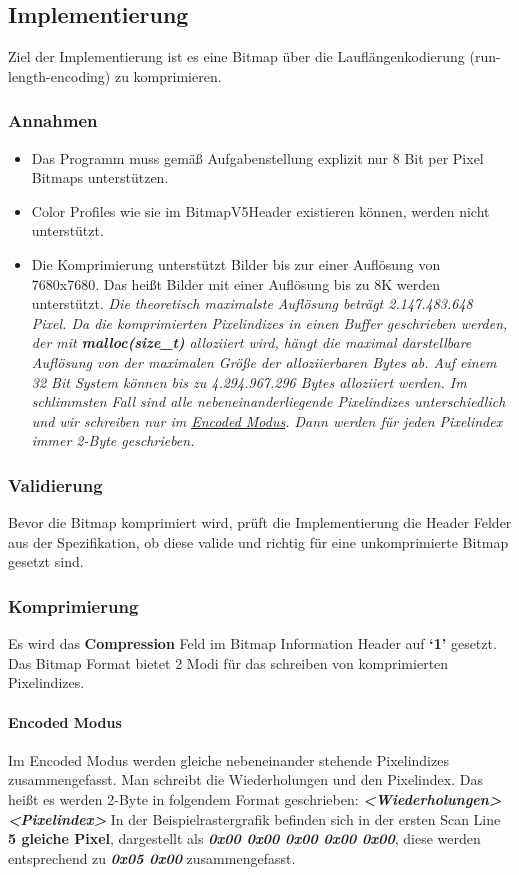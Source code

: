 \documentclass[course=erap]{aspdoc}
\begin{document}
\subsection{Implementierung}
Ziel der Implementierung ist es eine Bitmap über die Lauflängenkodierung (run-length-encoding) zu komprimieren.

\subsubsection{Annahmen}
\begin{itemize}
  \item Das Programm muss gemäß Aufgabenstellung explizit nur 8 Bit per Pixel Bitmaps unterstützen.
  \item Color Profiles wie sie im BitmapV5Header existieren können, werden nicht unterstützt.
  \item Die Komprimierung unterstützt Bilder bis zur einer Auflösung von 7680x7680. Das heißt Bilder mit einer Auflösung bis zu 8K werden unterstützt. \newline\newline
  \textit{Die theoretisch maximalste Auflösung beträgt 2.147.483.648 Pixel.
  Da die komprimierten Pixelindizes in einen Buffer geschrieben werden, der mit \textbf{malloc(size\_t)} alloziiert wird, hängt die maximal darstellbare Auflösung von der maximalen Größe der alloziierbaren Bytes ab. Auf einem 32 Bit System können bis zu 4.294.967.296 Bytes alloziiert werden. Im schlimmsten Fall sind alle nebeneinanderliegende Pixelindizes unterschiedlich und wir schreiben nur im \hyperref[sec:Encoded]{Encoded Modus}. Dann werden für jeden Pixelindex immer 2-Byte geschrieben.}

\end{itemize}

\subsubsection{Validierung}
Bevor die Bitmap komprimiert wird, prüft die Implementierung die Header Felder aus der Spezifikation, ob diese valide und richtig für eine unkomprimierte Bitmap gesetzt sind.
\subsubsection{Komprimierung}
Es wird das \textbf{Compression} Feld im Bitmap Information Header auf \textbf{`1'} gesetzt. Das Bitmap Format bietet 2 Modi für das schreiben von komprimierten Pixelindizes.
\paragraph{Encoded Modus}
\label{sec:Encoded}
Im Encoded Modus werden gleiche nebeneinander stehende Pixelindizes zusammengefasst.
Man schreibt die Wiederholungen und den Pixelindex. Das heißt es werden 2-Byte in folgendem Format geschrieben: \textbf{\textit{<Wiederholungen> <Pixelindex>}}
In der Beispielrastergrafik befinden sich in der ersten Scan Line \textbf{5 gleiche Pixel}, dargestellt als \textbf{\textit{0x00 0x00 0x00 0x00 0x00}}, diese werden entsprechend zu \textbf{\textit{0x05 0x00}} zusammengefasst.
\end{document}
